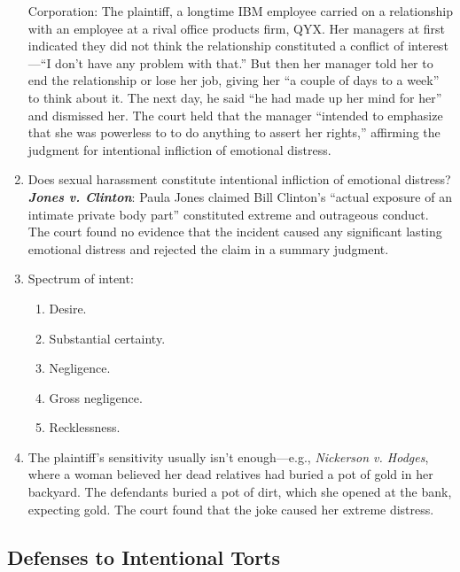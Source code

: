 \begin{enumerate}
{{    Corporation}}: The plaintiff, a longtime IBM employee carried on a 
    relationship with an employee at a rival office products firm, QYX. Her 
    managers at first indicated they did not think the relationship 
    constituted a conflict of interest---``I don't have any problem with 
    that.'' But then her manager told her to end the relationship or lose her 
    job, giving her ``a couple of days to a week'' to think about it. The next 
    day, he said ``he had made up her mind for her'' and dismissed her. The 
    court held that the manager ``intended to emphasize that she was powerless 
    to to do anything to assert her rights,'' affirming the judgment for 
    intentional infliction of emotional distress.
    \item Does sexual harassment constitute intentional infliction of 
    emotional distress? \textbf{\emph{Jones v. Clinton}}: Paula Jones claimed 
    Bill Clinton's ``actual exposure of an intimate private body part'' 
    constituted extreme and outrageous conduct. The court found no evidence 
    that the incident caused any significant lasting emotional distress and 
    rejected the claim in a summary judgment.
    \item Spectrum of intent:
    \begin{enumerate}
        \item Desire.
        \item Substantial certainty.
        \item Negligence.
        \item Gross negligence.
        \item Recklessness.
    \end{enumerate}
    \item The plaintiff's sensitivity usually isn't enough---e.g., 
    \emph{Nickerson v. Hodges}, where a woman believed her dead relatives had 
    buried a pot of gold in her backyard. The defendants buried a pot of dirt, 
    which she opened at the bank, expecting gold. The court found that the 
    joke caused her extreme distress.
\end{enumerate}

\subsection{Defenses to Intentional Torts}


